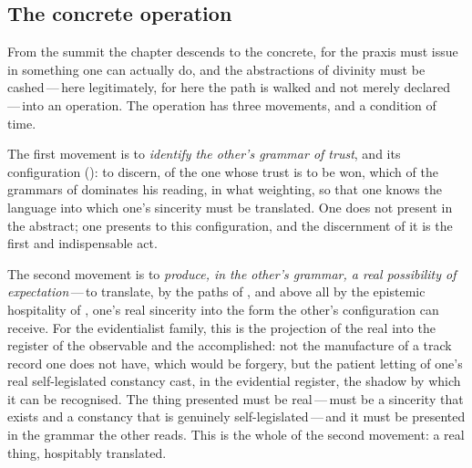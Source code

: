 \subsection{The concrete operation}
\label{p13:sub:prax-operation}

From the summit the chapter descends to the concrete, for the praxis must issue in something one can actually do, and the abstractions of divinity must be cashed\,---\,here legitimately, for here the path is walked and not merely declared\,---\,into an operation. The operation has three movements, and a condition of time.

The first movement is to \emph{identify the other's grammar of trust}, and its configuration (): to discern, of the one whose trust is to be won, which of the grammars of  dominates his reading, in what weighting, so that one knows the language into which one's sincerity must be translated. One does not present in the abstract; one presents to this configuration, and the discernment of it is the first and indispensable act.

The second movement is to \emph{produce, in the other's grammar, a real possibility of expectation}\,---\,to translate, by the paths of , and above all by the epistemic hospitality of , one's real sincerity into the form the other's configuration can receive. For the evidentialist family, this is the projection of the real into the register of the observable and the accomplished: not the manufacture of a track record one does not have, which would be forgery, but the patient letting of one's real self-legislated constancy cast, in the evidential register, the shadow by which it can be recognised. The thing presented must be real\,---\,must be a sincerity that exists and a constancy that is genuinely self-legislated\,---\,and it must be presented in the grammar the other reads. This is the whole of the second movement: a real thing, hospitably translated.

